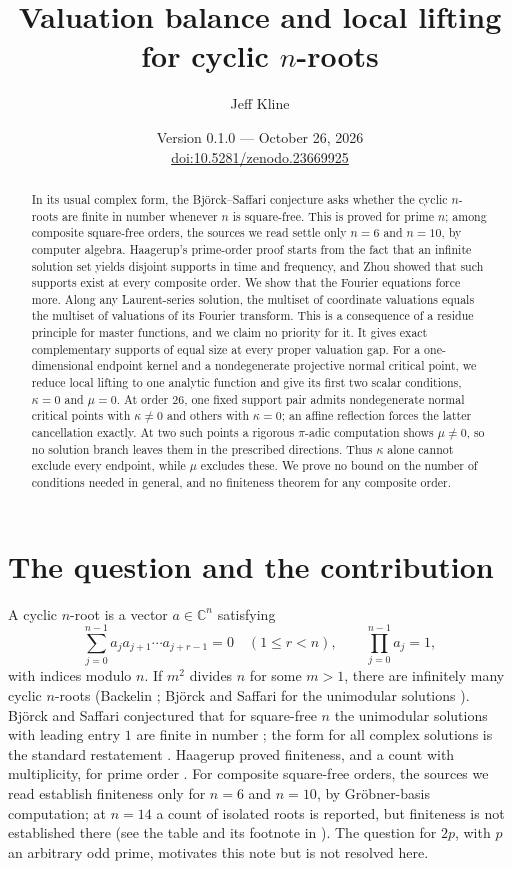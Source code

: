 \documentclass[11pt]{article}
\title{Valuation balance and local lifting for cyclic \texorpdfstring{$n$}{n}-roots}
\author{Jeff Kline}
\date{Version 0.1.0 --- October 26, 2026\\[3pt]\small\href{https://doi.org/10.5281/zenodo.23669925}{doi:10.5281/zenodo.23669925}}
\theoremstyle{remark}\newtheorem{remark}[theorem]{Remark}
\newcommand{\C}{\mathbb C}\newcommand{\Q}{\mathbb Q}
\begin{document}
\maketitle
\begin{abstract}
In its usual complex form, the Bj\"orck--Saffari conjecture asks whether
the cyclic $n$-roots are finite in number whenever $n$ is square-free. This
is proved for prime $n$; among composite square-free orders, the sources we read
settle only $n=6$ and $n=10$, by computer algebra. Haagerup's prime-order proof starts from the fact that an infinite
solution set yields disjoint supports in time and frequency, and Zhou showed
that such supports exist at every composite order. We show that the Fourier
equations force more. Along any Laurent-series solution, the multiset of
coordinate valuations equals the multiset of valuations of its Fourier
transform. This is a consequence of a residue principle for master
functions, and we claim no priority for it. It gives exact complementary
supports of equal size at every proper valuation gap. For a one-dimensional
endpoint kernel and a nondegenerate projective normal critical point, we
reduce local lifting to one analytic function and give its first two scalar
conditions, $\kappa=0$ and $\mu=0$. At order $26$, one fixed support pair
admits nondegenerate normal critical points with $\kappa\ne0$ and others with
$\kappa=0$; an affine reflection forces the latter cancellation exactly. At
two such points a rigorous $\pi$-adic computation shows $\mu\ne0$, so no
solution branch leaves them in the prescribed directions. Thus $\kappa$ alone
cannot exclude every endpoint, while $\mu$ excludes these. We prove no bound
on the number of conditions needed in general, and no finiteness theorem for
any composite order.
\end{abstract}

\section{The question and the contribution}
A cyclic $n$-root is a vector $a\in\C^n$ satisfying
\[
 \sum_{j=0}^{n-1}a_j a_{j+1}\cdots a_{j+r-1}=0\quad(1\le r<n),
 \qquad \prod_{j=0}^{n-1}a_j=1,
\]
with indices modulo $n$. If $m^2$ divides $n$ for some $m>1$, there are
infinitely many cyclic $n$-roots (Backelin \cite{Backelin}; Bj\"orck and
Saffari for the unimodular solutions \cite{BS95}). Bj\"orck and Saffari
conjectured that for square-free $n$ the unimodular solutions with leading
entry $1$ are finite in number \cite[Conj.~1.1]{FR}; the form for all complex
solutions is the standard restatement \cite{Zhou}. Haagerup proved
finiteness, and a count with multiplicity, for prime order \cite{Haagerup}.
For composite square-free orders, the sources we read establish finiteness
only for $n=6$ and $n=10$, by Gr\"obner-basis computation; at $n=14$ a count
of isolated roots is reported, but finiteness is not established there
(see the table and its footnote in \cite{FR}). The question for $2p$, with $p$ an arbitrary
odd prime, motivates this note but is not resolved here.
\end{document}

